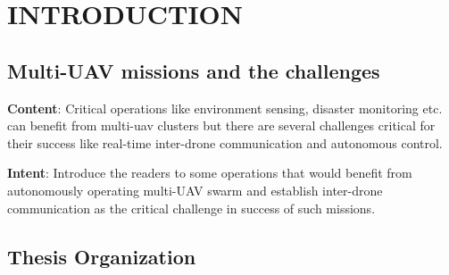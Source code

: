 \chapter{INTRODUCTION}
\label{chap-one}
\section{Multi-UAV missions and the challenges}

\textbf{Content}: Critical operations like environment sensing, disaster monitoring etc. can benefit from multi-uav clusters but there are several challenges critical for their success like real-time inter-drone communication  and autonomous control. 

\textbf{Intent}: Introduce the readers to some operations that would benefit from autonomously operating multi-UAV swarm and establish inter-drone communication as the critical challenge in success of such missions.

\section{Thesis Organization}

